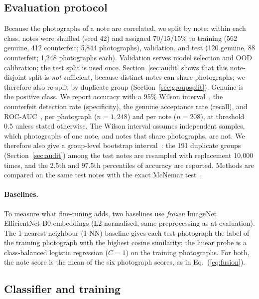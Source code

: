 \documentclass[pdflatex,sn-mathphys-num]{sn-jnl}
\begin{document}
\subsection{Evaluation protocol}\label{sec:protocol}

Because the photographs of a note are correlated, we split by note: within each class,
notes were shuffled (seed 42) and assigned 70/15/15\% to training (562 genuine, 412
counterfeit; 5{,}844 photographs), validation, and test (120 genuine, 88 counterfeit;
1{,}248 photographs each). Validation serves model selection and OOD calibration; the
test split is used once. Section~\ref{sec:audit} shows that this note-disjoint split is
\emph{not} sufficient, because distinct notes can share photographs; we therefore also
re-split by duplicate group (Section~\ref{sec:groupsplit}). Genuine is the
positive class. We report accuracy with a 95\% Wilson
interval~\cite{wilson1927probable}, the counterfeit detection rate (specificity), the
genuine acceptance rate (recall), and ROC-AUC~\cite{fawcett2006roc}, per photograph
($n=1{,}248$) and per note ($n=208$), at threshold 0.5 unless stated otherwise.
The Wilson interval assumes independent samples, which photographs of one note, and
notes that share photographs, are not. We therefore also give a group-level bootstrap
interval~\cite{efron1993bootstrap}: the 191 duplicate groups (Section~\ref{sec:audit})
among the test notes are resampled with replacement 10{,}000 times, and the 2.5th and
97.5th percentiles of accuracy are reported. Methods are compared on the same test notes
with the exact McNemar test~\cite{mcnemar1947,dietterich1998tests}.

\paragraph{Baselines.} To measure what fine-tuning adds, two baselines use \emph{frozen}
ImageNet EfficientNet-B0 embeddings (L2-normalised, same preprocessing as at
evaluation). The 1-nearest-neighbour (1-NN) baseline gives each test photograph the
label of the training photograph with the highest cosine similarity; the linear probe is
a class-balanced logistic regression ($C=1$) on the training photographs. For both, the
note score is the mean of the six photograph scores, as in Eq.~(\ref{eq:fusion}).

\subsection{Classifier and training}\label{sec:training}
\end{document}
